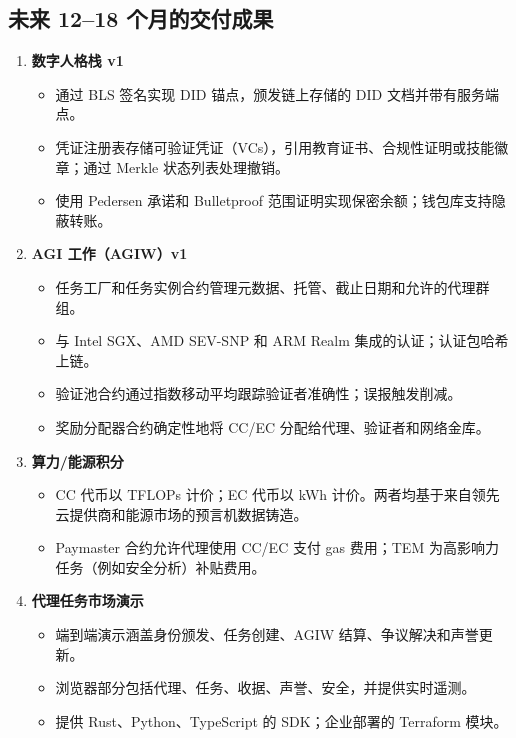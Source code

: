 \documentclass[11pt]{article}
\begin{document}
\subsection{未来 12--18 个月的交付成果}
\begin{enumerate}[label=\textbf{D\arabic*.}, leftmargin=*]
  \item \textbf{数字人格栈 v1}
  \begin{itemize}[noitemsep]
    \item 通过 BLS 签名实现 DID 锚点，颁发链上存储的 DID 文档并带有服务端点。
    \item 凭证注册表存储可验证凭证（VCs），引用教育证书、合规性证明或技能徽章；通过 Merkle 状态列表处理撤销。
    \item 使用 Pedersen 承诺和 Bulletproof 范围证明实现保密余额；钱包库支持隐蔽转账。
  \end{itemize}
  \item \textbf{AGI 工作（AGIW）v1}
  \begin{itemize}[noitemsep]
    \item 任务工厂和任务实例合约管理元数据、托管、截止日期和允许的代理群组。
    \item 与 Intel SGX、AMD SEV-SNP 和 ARM Realm 集成的认证；认证包哈希上链。
    \item 验证池合约通过指数移动平均跟踪验证者准确性；误报触发削减。
    \item 奖励分配器合约确定性地将 CC/EC 分配给代理、验证者和网络金库。
  \end{itemize}
  \item \textbf{算力/能源积分}
  \begin{itemize}[noitemsep]
    \item CC 代币以 TFLOPs 计价；EC 代币以 kWh 计价。两者均基于来自领先云提供商和能源市场的预言机数据铸造。
    \item Paymaster 合约允许代理使用 CC/EC 支付 gas 费用；TEM 为高影响力任务（例如安全分析）补贴费用。
  \end{itemize}
  \item \textbf{代理任务市场演示}
  \begin{itemize}[noitemsep]
    \item 端到端演示涵盖身份颁发、任务创建、AGIW 结算、争议解决和声誉更新。
    \item 浏览器部分包括代理、任务、收据、声誉、安全，并提供实时遥测。
    \item 提供 Rust、Python、TypeScript 的 SDK；企业部署的 Terraform 模块。
  \end{itemize}
\end{enumerate}
\end{document}
